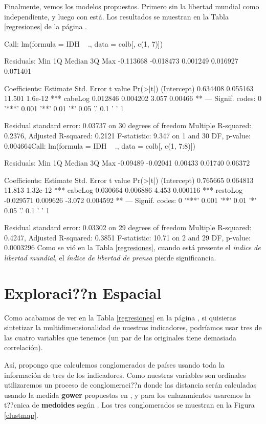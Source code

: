 \documentclass{article}
\begin{document}
Finalmente, vemos los modelos propuestos. Primero sin la libertad mundial como independiente, y luego con est\'a. Los resultados se muestran en la Tabla \ref{regresiones} de la p\'agina \pageref{regresiones}.


Call:
lm(formula = IDH ~ ., data = colb[, c(1, 7)])

Residuals:
      Min        1Q    Median        3Q       Max 
-0.113668 -0.018473  0.001249  0.016927  0.071401 

Coefficients:
            Estimate Std. Error t value Pr(>|t|)    
(Intercept) 0.634408   0.055163  11.501  1.6e-12 ***
cabeLog     0.012846   0.004202   3.057  0.00466 ** 
---
Signif. codes:  0 '***' 0.001 '**' 0.01 '*' 0.05 '.' 0.1 ' ' 1

Residual standard error: 0.03737 on 30 degrees of freedom
Multiple R-squared:  0.2376,	Adjusted R-squared:  0.2121 
F-statistic: 9.347 on 1 and 30 DF,  p-value: 0.004664Call:
lm(formula = IDH ~ ., data = colb[, c(1, 7:8)])

Residuals:
     Min       1Q   Median       3Q      Max 
-0.09489 -0.02041  0.00433  0.01740  0.06372 

Coefficients:
             Estimate Std. Error t value Pr(>|t|)    
(Intercept)  0.765665   0.064813  11.813 1.32e-12 ***
cabeLog      0.030664   0.006886   4.453 0.000116 ***
restoLog    -0.029571   0.009626  -3.072 0.004592 ** 
---
Signif. codes:  0 '***' 0.001 '**' 0.01 '*' 0.05 '.' 0.1 ' ' 1

Residual standard error: 0.03302 on 29 degrees of freedom
Multiple R-squared:  0.4247,	Adjusted R-squared:  0.3851 
F-statistic: 10.71 on 2 and 29 DF,  p-value: 0.0003296
Como se vi\'o en la Tabla \ref{regresiones}, cuando est\'a presente el \emph{indice de libertad mundial}, el \emph{\'indice de libertad de prensa} pierde significancia.

\clearpage

\section{Exploraci??n Espacial}

Como acabamos de ver en la Tabla \ref{regresiones} en la p\'agina \pageref{regresiones}, si quisieras sintetizar la multidimensionalidad de nuestros indicadores, podr\'iamos usar tres de las cuatro variables que tenemos (un par de las originales tiene demasiada correlaci\'on). 

As\'i, propongo que calculemos conglomerados de pa\'ises usando toda la informaci\'on de tres de los indicadores. Como nuestras variables son ordinales utilizaremos un proceso de conglomeraci??n donde las distancia ser\'an calculadas usando la medida {\bf gower} propuestas en \cite{gower_general_1971}, y para los enlazamientos usaremos la t??cnica de {\bf medoides} seg\'un \cite{reynolds_clustering_2006}. Los tres conglomerados se muestran en la Figura \ref{clustmap}.
\end{document}

